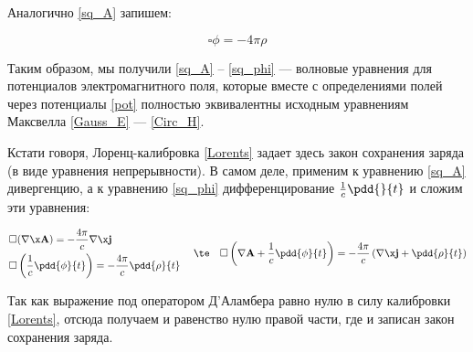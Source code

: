 \documentclass[12pt]{kiarticle}
\begin{document}
Аналогично \eqref{sq_A} запишем:

\begin{equation}\label{sq_phi}
\square \phi = - 4 \pi \rho
\end{equation}

Таким образом, мы получили \eqref{sq_A} -- \eqref{sq_phi} --- волновые уравнения для потенциалов электромагнитного поля, которые вместе с определениями полей через потенциалы \eqref{pot} полностью эквивалентны исходным уравнениям Максвелла \eqref{Gauss_E} --- \eqref{Circ_H}. 

Кстати говоря, Лоренц-калибровка \eqref{Lorents} задает здесь закон сохранения заряда (в виде уравнения непрерывности). В самом деле, применим к уравнению \eqref{sq_A} дивергенцию, а к уравнению \eqref{sq_phi} дифференцирование $ \frac{1}{c}\pdd{}{t} $ и сложим эти уравнения: 

\begin{equation}\label{}
\left.
\begin{aligned}
& \square (\nabla \x \mathbf{A}) = - \dfrac{4\pi}{c} \nabla \x \mathbf{j} \\
& \square \left(  \dfrac{1}{c}\pdd{\phi}{t} \right)  = - \dfrac{4\pi}{c} \pdd{\rho}{t}
\end{aligned}
\right.
\quad \te \quad
\square \left( \nabla \mathbf{A}+ \dfrac{1}{c} \pdd{\phi}{t} \right)  = - \dfrac{4 \pi}{c} \left(  \nabla \x \mathbf{j} + \pdd{\rho}{t} \right) 
\end{equation}

Так как выражение под оператором Д'Аламбера равно нулю в силу калибровки \eqref{Lorents}, отсюда получаем и равенство нулю правой части, где и записан закон сохранения заряда. 


%
%
\end{document}
